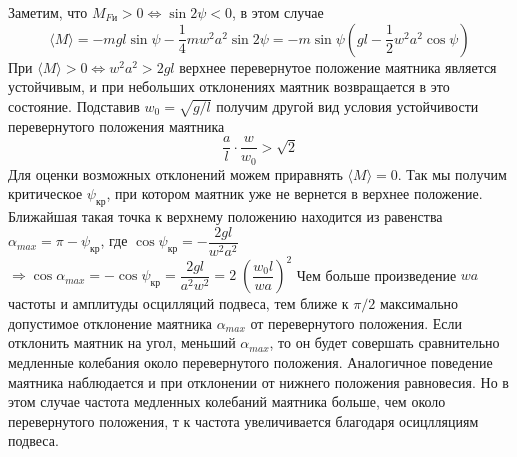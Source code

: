 \documentclass[a4paper,12pt]{article}
\begin{document}
Заметим, что $M_{Fи} > 0 \Leftrightarrow \sin{2\psi} < 0$, в этом случае 
\begin{equation}
\label{M}
\langle M \rangle = -mgl\sin{\psi} - \dfrac{1}{4}mw^2a^2\sin{2\psi} = -m\sin{\psi}(gl - \dfrac{1}{2}w^2a^2\cos{\psi})
\end{equation} 
При $\langle M \rangle > 0 \Leftrightarrow w^2a^2 > 2gl$ верхнее перевернутое положение маятника является устойчивым, и при небольших отклонениях маятник возвращается в это состояние. Подставив $w_0 = \sqrt{g/l}$ получим другой вид условия устойчивости перевернутого положения маятника
\begin{equation}
\label{ust}
\frac{a}{l}\cdot\frac{w}{w_0} > \sqrt{2}
\end{equation} 
Для оценки возможных отклонений можем приравнять $\langle M\rangle = 0$. Так мы получим критическое $\psi_{кр}$, при котором маятник уже не вернется в верхнее положение. Ближайшая такая точка к верхнему положению находится из равенства $\alpha_{max} = \pi - \psi_{кр}$, где $\cos{\psi_{кр}} = -\dfrac{2gl}{w^2a^2}$ $\Rightarrow \cos{\alpha_{max}} = -\cos{\psi_{кр}} = \dfrac{2gl}{a^2w^2} = 2\;(\dfrac{w_0l}{wa})^2$ 
Чем больше произведение $wa$ частоты и амплитуды осцилляций подвеса, тем ближе к $\pi/2$ максимально допустимое отклонение маятника $\alpha_{max}$ от перевернутого положения. Если отклонить маятник на угол, меньший $\alpha_{max}$, то он будет совершать сравнительно медленные колебания около перевернутого положения. Аналогичное поведение маятника наблюдается и при отклонении от нижнего положения равновесия. Но в этом случае частота медленных колебаний маятника больше, чем около перевернутого положения, т к частота увеличивается благодаря осицлляциям подвеса.
\newpage
\end{document}
